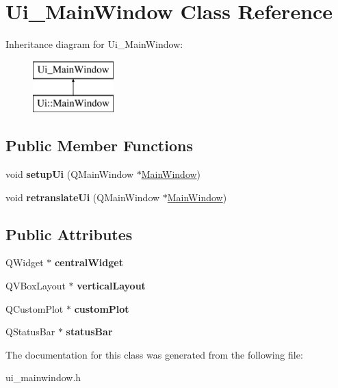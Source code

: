 \hypertarget{classUi__MainWindow}{}\section{Ui\+\_\+\+Main\+Window Class Reference}
\label{classUi__MainWindow}
Inheritance diagram for Ui\+\_\+\+Main\+Window\+:\begin{figure}[H]
\begin{center}
\leavevmode
\includegraphics[height=2.000000cm]{classUi__MainWindow}
\end{center}
\end{figure}
\subsection*{Public Member Functions}
\begin{DoxyCompactItemize}
\item 
void {\bfseries setup\+Ui} (Q\+Main\+Window $\ast$\hyperlink{classMainWindow}{Main\+Window})\hypertarget{classUi__MainWindow_acf4a0872c4c77d8f43a2ec66ed849b58}{}\label{classUi__MainWindow_acf4a0872c4c77d8f43a2ec66ed849b58}

\item 
void {\bfseries retranslate\+Ui} (Q\+Main\+Window $\ast$\hyperlink{classMainWindow}{Main\+Window})\hypertarget{classUi__MainWindow_a097dd160c3534a204904cb374412c618}{}\label{classUi__MainWindow_a097dd160c3534a204904cb374412c618}

\end{DoxyCompactItemize}
\subsection*{Public Attributes}
\begin{DoxyCompactItemize}
\item 
Q\+Widget $\ast$ {\bfseries central\+Widget}\hypertarget{classUi__MainWindow_a30075506c2116c3ed4ff25e07ae75f81}{}\label{classUi__MainWindow_a30075506c2116c3ed4ff25e07ae75f81}

\item 
Q\+V\+Box\+Layout $\ast$ {\bfseries vertical\+Layout}\hypertarget{classUi__MainWindow_aecd96a04789fcfec3f98d80390ad8184}{}\label{classUi__MainWindow_aecd96a04789fcfec3f98d80390ad8184}

\item 
Q\+Custom\+Plot $\ast$ {\bfseries custom\+Plot}\hypertarget{classUi__MainWindow_a1e91de1cfe5e44c392cc587158177e7b}{}\label{classUi__MainWindow_a1e91de1cfe5e44c392cc587158177e7b}

\item 
Q\+Status\+Bar $\ast$ {\bfseries status\+Bar}\hypertarget{classUi__MainWindow_a50fa481337604bcc8bf68de18ab16ecd}{}\label{classUi__MainWindow_a50fa481337604bcc8bf68de18ab16ecd}

\end{DoxyCompactItemize}


The documentation for this class was generated from the following file\+:\begin{DoxyCompactItemize}
\item 
ui\+\_\+mainwindow.\+h\end{DoxyCompactItemize}
